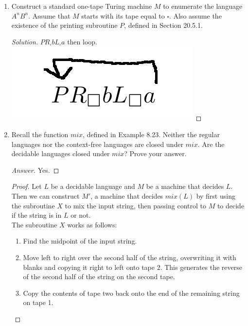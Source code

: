 \documentclass[10pt]{article}
\begin{document}
\begin{enumerate}[1)]

\item
Construct a standard one-tape Turing machine $M$ to enumerate the language $A^nB^n$. Assume that $M$ starts with
its tape equal to $\square$. Also assume the existence of the printing subroutine $P$, defined in Section 20.5.1.
\begin{proof}[Solution]
$PR_\square bL_\square a$ then loop.\\
\includegraphics[scale=.3]{solution4.png}
\end{proof}

\pagebreak

\item
Recall the function $mix$, defined in Example 8.23. Neither the regular languages nor the context-free languages
are closed under $mix$. Are the decidable languages closed under $mix$? Prove your answer.
\begin{proof}[Answer]
Yes.
\end{proof}
\begin{proof}[Proof]
Let $L$ be a decidable language and $M$ be a machine that decides $L$.  Then we can construct $M'$, a machine that decides $mix(L)$ by first using the subroutine $X$ to mix the input string, then passing control to $M$ to decide if the string is in $L$ or not.\\

The subroutine $X$ works as follows:\\
\begin{enumerate}[1.]
\item
Find the midpoint of the input string.

\item
Move left to right over the second half of the string, overwriting it with blanks and copying it right to left onto tape 2.  This generates the reverse of the second half of the string on the second tape.

\item
Copy the contents of tape two back onto the end of the remaining string on tape 1.
\end{enumerate}
\end{proof}



\end{enumerate}
\end{document}
